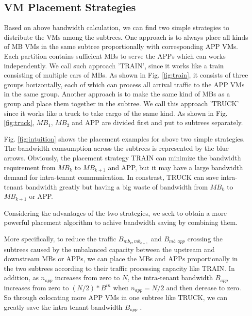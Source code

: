 \documentclass[review]{elsarticle}
\begin{document}
\subsection{VM Placement Strategies}
Based on above bandwidth calculation, we can find two simple strategies to distribute the VMs among the subtrees. One approach is to always place all kinds of MB VMs in the same subtree proportionally with corresponding APP VMs. Each partition contains sufficient MBs to serve the APPs which can works independently. We call such approach 'TRAIN', since it works like a train consisting of multiple cars of MBs. As shown in Fig. \ref{fig:train}, it consists of three groups horizontally, each of which can process all arrival traffic to the APP VMs in the same group. Another approach is to make the same kind of MBs as a group and place them together in the subtree. We call this approach 'TRUCK' since it works like a truck to take cargo of the same kind. As shown in Fig. \ref{fig:truck}, $MB_1$, $MB_2$ and APP are divided first and put to subtrees separately.

Fig. \ref{fig:intuition} shows the placement examples for above two simple strategies. The bandwidth comsumption across the subtrees is represented by the blue arrows. Obviously, the placement strategy TRAIN can minimize the bandwidth requirement from $MB_k$ to $MB_{k+1}$ and APP, but it may have a large bandwidth demand for intra-tenant communication. In constrast, TRUCK can save intra-tenant bandwidth greatly but having a big waste of bandwidth from $MB_k$ to $MB_{k+1}$ or APP. 


Considering the advantages of the two strategies, we seek to obtain a more powerful placement algorithm to achive bandwidth saving by combining them. 

More specifically, to reduce the traffic $B_{mb_k,mb_{k+1}}$ and $B_{mb,app}$ crossing the subtrees caused by the unbalanced capacity between the upstream and downstream MBs or APPs, we can place the MBs and APPs proportionally in the two subtrees according to their traffic processing capacity like TRAIN. In addition, as $n_{app}$ increases from zero to $N$, the intra-tenant bandwidth $B_{app}$ increases from zero to $(N/2)*B^{in}$ when $n_{app} = N/2$ and then derease to zero. So through colocating more APP VMs in one subtree like TRUCK, we can greatly save the intra-tenant bandwidth $B_{app}$ . 
\end{document}

